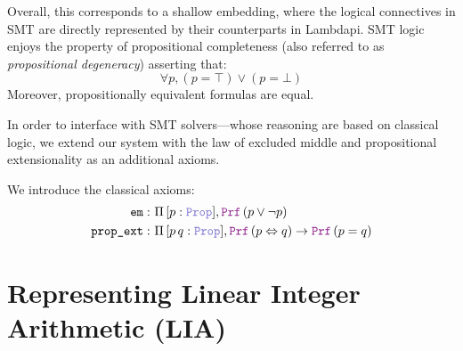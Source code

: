 Overall, this corresponds to a shallow embedding, where the logical connectives in SMT are directly represented by their counterparts in Lambdapi.
SMT logic enjoys the property of propositional completeness (also referred to as \emph{propositional degeneracy}) asserting that:
 \[
  \forall p,(p = \top) \lor (p = \bot)
\]
Moreover, propositionally equivalent formulas are equal.

In order to interface with SMT solvers—whose reasoning are based on classical logic,
we extend our system with the law of excluded middle and propositional extensionality as an additional axioms.


\begin{definition}
We introduce the classical axioms:
\begin{align*}
\tt{em} \index{$\tt{em}$}:\ & \Pi\, [p: \prop], \prf\,(p \lor \neg p) \\
\tt{prop\_ext} \index{$\tt{prop\_ext}$}:\ & \Pi\, [p\,q: \prop], \prf\,(p \Leftrightarrow q ) \rightarrow \prf\,(p = q)
\end{align*}
\label{def:classical-facts}
\end{definition}

\section{Representing Linear Integer Arithmetic (\textbf{\uppercase{LIA}})}
\label{ssec:encoding-lia}

